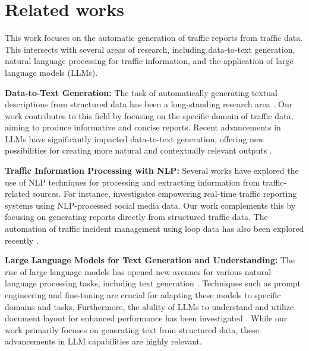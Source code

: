 \documentclass[fleqn,moreauthors,10pt]{ds_report}
\begin{document}

\section*{Related works}

This work focuses on the automatic generation of traffic reports from traffic data. This intersects with several areas of research, including data-to-text generation, natural language processing for traffic information, and the application of large language models (LLMs).

\textbf{Data-to-Text Generation:} The task of automatically generating textual descriptions from structured data has been a long-standing research area \cite{Data2Text}. Our work contributes to this field by focusing on the specific domain of traffic data, aiming to produce informative and concise reports. Recent advancements in LLMs have significantly impacted data-to-text generation, offering new possibilities for creating more natural and contextually relevant outputs \cite{LlamaIndex2025}.

\textbf{Traffic Information Processing with NLP:} Several works have explored the use of NLP techniques for processing and extracting information from traffic-related sources. For instance, \cite{articleRTTRS} investigates empowering real-time traffic reporting systems using NLP-processed social media data. Our work complements this by focusing on generating reports directly from structured traffic data. The automation of traffic incident management using loop data has also been explored recently \cite{cercola2025automatinglooptrafficincident}.

\textbf{Large Language Models for Text Generation and Understanding:} The rise of large language models has opened new avenues for various natural language processing tasks, including text generation \cite{vreš2024generativemodellessresourcedlanguage, zhu2024multilingualmachinetranslationlarge, pelofske2024automatedmultilanguageenglishmachine, peng2024automaticnewsgenerationfactchecking}. Techniques such as prompt engineering \cite{white2023promptpatterncatalogenhance} and fine-tuning \cite{j2024finetuningllmenterprise, j2024finetuningllmenterprise} are crucial for adapting these models to specific domains and tasks. Furthermore, the ability of LLMs to understand and utilize document layout for enhanced performance has been investigated \cite{10.1007/978-3-031-70546-5_9}. While our work primarily focuses on generating text from structured data, these advancements in LLM capabilities are highly relevant.
\end{document}
